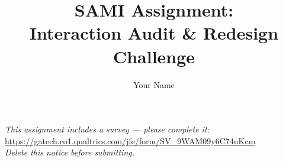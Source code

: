 \documentclass[
	letterpaper, %
]{jdf}
\author{Your Name}
\title{SAMI Assignment:\\Interaction Audit \& Redesign Challenge}
\begin{document}
\maketitle

\begin{center}
	\textit{This assignment includes a survey — please complete it:}\\
	\href{https://gatech.co1.qualtrics.com/jfe/form/SV_9WAM09y6C74uKcm}{https://gatech.co1.qualtrics.com/jfe/form/SV\_9WAM09y6C74uKcm}\\
	\textit{Delete this notice before submitting.}
\end{center}

%
%
%
%

\end{document}
